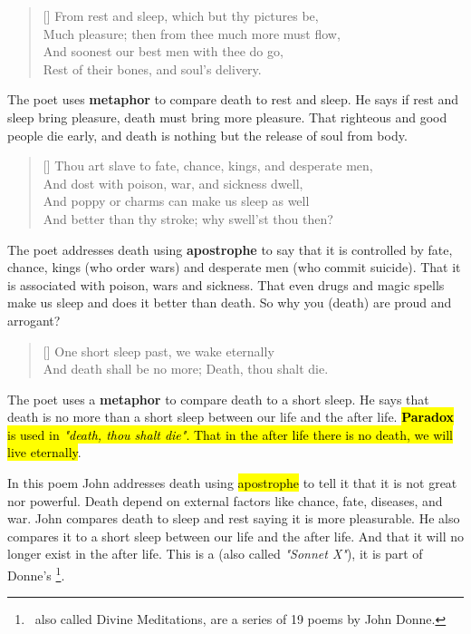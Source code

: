 \begin{verse}[\versewidth]
{\fontverse
From rest and sleep, which but thy pictures be,\\
Much pleasure; then from thee much more must flow,\\
And soonest our best men with thee do go,\\
Rest of their bones, and soul's delivery.
} 
\end{verse}

The poet uses \textbf{metaphor} to compare death to rest and sleep. He 
says if rest and sleep bring pleasure, death must bring more
pleasure. That righteous and good people die early, and death is nothing but the 
release of soul from body.

\begin{verse}[\versewidth]
{\fontverse
Thou art slave to fate, chance, kings, and desperate men,\\
And dost with poison, war, and sickness dwell,\\
And poppy or charms can make us sleep as well\\
And better than thy stroke; why swell'st thou then?
} 
\end{verse}

The poet addresses death using \textbf{apostrophe} to say that
it is controlled by fate, chance, kings (who order wars) and desperate men (who commit suicide).
That it is associated with poison, wars and sickness. That even drugs and magic spells make us
sleep and does it better than death. So why you (death) are proud and arrogant?

\begin{verse}[\versewidth]
{\fontverse
One short sleep past, we wake eternally\\
And death shall be no more; Death, thou shalt die.
} 
\end{verse}

The poet uses a \textbf{metaphor} to compare death to a short sleep.
He says that death is no more than a short sleep between our life 
and the after life. \hl{\textbf{Paradox} is used in \textit{"death, thou shalt die"}.
That in the after life there is no death, we will live eternally}. 


In this poem John addresses death using \hl{apostrophe} to tell it that
it is not great nor powerful. Death depend on external factors like chance, 
fate, diseases, and war. John compares death to sleep and rest saying it 
is more pleasurable. He also compares it to a short sleep between 
our life and the after life. And that it will no longer exist in the after life.
This is a  (also called \textit{"Sonnet X"}), it is part of Donne's 
\footnote{\, also called Divine Meditations, 
are a series of 19 poems by John Donne.}.


